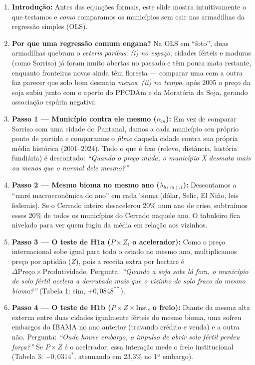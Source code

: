 \documentclass[11pt,a4paper]{article}
\begin{document}
\vspace{0.8mm}
{\small
\begin{enumerate}[leftmargin=*,label=\textbf{(\arabic*)},itemsep=1.2mm,topsep=1mm]
    \item \textbf{Introdução:} Antes das equações formais, este slide mostra intuitivamente o que testamos e \textit{como} comparamos os municípios sem cair nas armadilhas da regressão simples (OLS).
    \item \textbf{Por que uma regressão comum engana?} Na OLS em ``foto'', duas armadilhas quebram o \textit{ceteris paribus}: \textit{(i) no espaço}, cidades férteis e maduras (como Sorriso) já foram muito abertas no passado e têm pouca mata restante, enquanto fronteiras novas ainda têm floresta --- comparar uma com a outra faz parecer que solo bom desmata \textit{menos}; \textit{(ii) no tempo}, após 2005 o preço da soja subiu junto com o aperto do PPCDAm e da Moratória da Soja, gerando associação espúria negativa.
    \item \textbf{Passo 1 --- Município contra ele mesmo ($\alpha_m$):} Em vez de comparar Sorriso com uma cidade do Pantanal, damos a cada município seu próprio ponto de partida e comparamos o \textit{filme} daquela cidade contra sua própria média histórica (2001--2024). Tudo o que é fixo (relevo, distância, história fundiária) é descontado: \textit{``Quando o preço muda, o município X desmata mais ou menos que o normal dele mesmo?''}
    \item \textbf{Passo 2 --- Mesmo bioma no mesmo ano ($\lambda_{b(m),t}$):} Descontamos a ``maré macroeconômica do ano'' em cada bioma (dólar, Selic, El Niño, leis federais). Se o Cerrado inteiro desacelerou 20\% num ano de crise, subtraímos esses 20\% de todos os municípios do Cerrado naquele ano. O tabuleiro fica nivelado para ver quem fugiu da média em relação aos vizinhos.
    \item \textbf{Passo 3 --- O teste de H1a ($P \times Z$, o acelerador):} Como o preço internacional sobe igual para todo o estado no mesmo ano, multiplicamos preço por aptidão ($Z$), pois a receita extra por hectare é $\Delta\text{Preço} \times \text{Produtividade}$. Pergunta: \textit{``Quando a soja sobe lá fora, o município de solo fértil acelera a derrubada mais que o vizinho de solo fraco do mesmo bioma?''} (Tabela 1: sim, $+0{,}0848^{**}$).
    \item \textbf{Passo 4 --- O teste de H1b ($P \times Z \times \text{Inst}$, o freio):} Diante da mesma alta externa entre duas cidades igualmente férteis do mesmo bioma, uma sofreu embargos do IBAMA no ano anterior (travando crédito e venda) e a outra não. Pergunta: \textit{``Onde houve embargo, o impulso de abrir solo fértil perdeu força?''} Se $P \times Z$ é o acelerador, essa interação mede o freio institucional (Tabela 3: $-0{,}0314^{*}$, atenuando em 23,3\% no 1º embargo).

\end{enumerate}}
\end{document}
